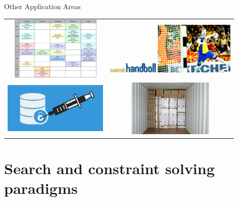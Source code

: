 \documentclass{cons-beamer}
\begin{document}
\begin{frame}{Other Application Areas}
  \begin{tabular}{CC}
     \newline
    \includegraphics[height=30mm]{images/timetable}
    &
     \newline
    \includegraphics[height=5mm]{images/SEH} \newline
    \includegraphics[height=25mm]{images/handball}
    \\[+8mm]
     \newline
    \includegraphics[height=24mm]{images/sqlinjection.png}
    &
     \newline
    \includegraphics[height=27mm]{images/binPacking}
  \end{tabular}
\end{frame}


\section{Search and constraint solving paradigms}
\end{document}
